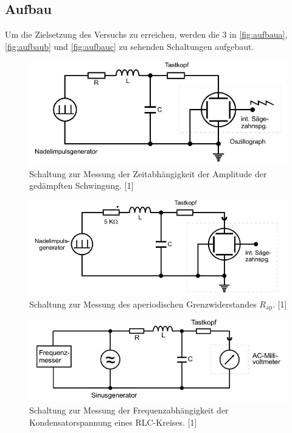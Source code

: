 \documentclass[
  bibliography=totoc,     %
  captions=tableheading,  %
  titlepage=firstiscover, %
]{scrartcl}
\begin{document}
  \subsection{Aufbau}
  Um die Zielsetzung des Versuchs zu erreichen, werden die 3 in \autoref{fig:aufbaua}, \autoref{fig:aufbaub} und \autoref{fig:aufbauc} zu sehenden Schaltungen aufgebaut.
  \begin{figure}[h]
      \centering
      \includegraphics[width=\textwidth]{aufbaua.JPG}
      \caption{Schaltung zur Messung der Zeitabhängigkeit der Amplitude der gedämpften Schwingung. [1]}
      \label{fig:aufbaua}
    \end{figure}
  \noindent

  \begin{figure}[h]
      \centering
      \includegraphics[width=\textwidth]{aufbaub.JPG}
      \caption{Schaltung zur Messung des aperiodischen Grenzwiderstandes $R_{\text{ap}}$. [1]}
      \label{fig:aufbaub}
    \end{figure}
  \noindent

  \begin{figure}[h]
      \centering
      \includegraphics[width=\textwidth]{aufbauc.JPG}
      \caption{Schaltung zur Messung der Frequenzabhängigkeit der Kondensatorspannung eines RLC-Kreises. [1]}
      \label{fig:aufbauc}
    \end{figure}
  \noindent
 
\end{document}
